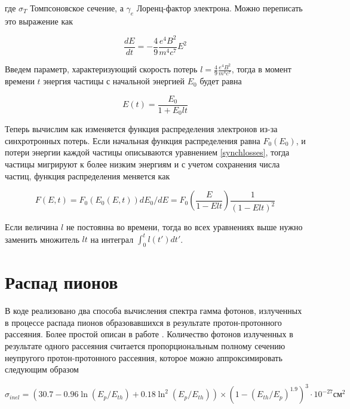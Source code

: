 где $\sigma_T$ Томпсоновское сечение, а $\gamma_e$ Лоренц-фактор электрона. Можно переписать это выражение как

\begin{equation} \label{synchlosses}
	\frac{dE}{dt} = - \frac{4}{9} \frac{e^4 B^2}{m^4 c^7} E^2
\end{equation}

Введем параметр, характеризующий скорость потерь $l = \frac{4}{9} \frac{e^4 B^2}{m^4 c^7}$, тогда в момент времени $t$ энергия частицы с начальной энергией $E_0$ будет равна

\begin{equation}
	E(t) = \frac{E_0}{1 + E_0 l t}
\end{equation}

Теперь вычислим как изменяется функция распределения электронов из-за синхротронных потерь. Если начальная функция распределения равна $F_0(E_0)$, и потери энергии каждой частицы описываются уравнением \ref{synchlosses}, тогда частицы мигрируют к более низким энергиям и с учетом сохранения числа частиц, функция распределения меняется как

\begin{equation}
	F(E,t) = F_0\left(E_0(E,t)\right) dE_0/dE = F_0\left(\frac{E}{1-E l t}\right)\frac{1}{\left(1 - E l t\right)^2}
\end{equation}

Если величина $l$ не постоянна во времени, тогда во всех уравнениях выше нужно заменить множитель $l t$ на интеграл $\int_0^t l(t')dt'$.

\section{Распад пионов}\label{PionFormulae}

В коде реализовано два способа вычисления спектра гамма фотонов, излученных в процессе распада пионов образовавшихся в результате протон-протонного рассеяния. Более простой описан в работе \cite{Kelner}. Количество фотонов излученных в результате одного рассеяния считается пропорциональным полному сечению неупругого протон-протонного рассеяния, которое можно аппроксимировать следующим образом \cite{Kafexhiu}

\begin{equation}\label{sigmainel}
	\sigma_{inel} = \left(30.7 - 0.96\ln\left(E_p/E_{th}\right) + 0.18\ln^2\left(E_p/E_{th}\right) \right)\times\left(1 - \left(E_{th}/E_p\right)^{1.9}\right)^3\cdot10^{-27} \text{см}^{2}
\end{equation}

